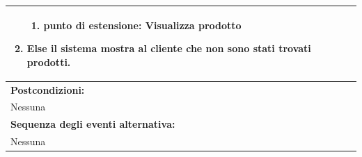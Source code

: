 \begin{center}
\begin{tabular}{ |p{12cm}| }
\begin{enumerate}[nosep, left=0pt]
\begin{enumerate}[nosep, left=0pt]
            \item[]\hspace*{-0.87cm} punto di estensione: Visualizza prodotto
        \end{enumerate}
        \item \textbf{Else} il sistema mostra al cliente che non sono stati trovati prodotti. 
    \end{enumerate} \\[-1em]
    \hline
    \textbf{Postcondizioni:} \\
    Nessuna \\
    \hline
    \textbf{Sequenza degli eventi alternativa:} \\
    Nessuna \\
    \hline
\end{tabular}
\end{center}


\newpage
